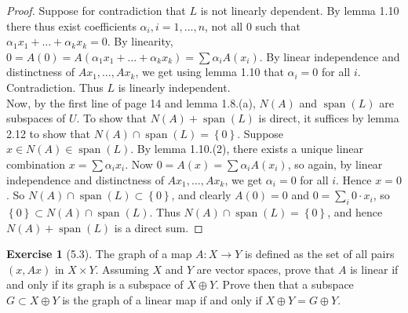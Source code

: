 \documentclass[reqno]{amsart}
\theoremstyle{definition}
\newtheorem{exercise}[theorem]{Exercise}
\theoremstyle{remark}
\DeclareMathOperator{\Span}{span}
\begin{document}
\begin{proof}
    Suppose for contradiction that
    $L$ is not linearly dependent. By lemma 1.10 there
    thus exist coefficients $\alpha_i, i
    =1, \ldots, n$, not all $0$ such that
    $\alpha_1 x_1 +\ldots + \alpha_k x_k = 0$. By linearity,
    $0 = A(0) = 
    A \left( \alpha_1 x_1 +\ldots+ \alpha_k x_k \right) 
    = \sum \alpha_i A(x_i)$. By linear independence and
    distinctness of
    $Ax_1, \ldots, Ax_k$, we get using lemma 1.10 that
    $ \alpha_i = 0$ for all $i$. Contradiction. Thus
    $L$ is linearly independent.\\
    Now, by the first line of page 14 and
    lemma 1.8.(a),
    $N(A)$ and $\Span (L)$ are subspaces of $U$. 
    To show that $N(A) + \Span(L)$ is direct,
    it suffices by lemma 2.12 to show that
    $N(A) \cap \Span (L) = \left\{ 0 \right\} $.
    Suppose $x \in N(A) \in \Span (L)$. By
    lemma 1.10.(2), there exists a unique linear
    combination $x = \sum \alpha_i x_i$. Now
    $0 = A(x) = \sum \alpha_i A(x_i)$, so
    again, by linear independence and distinctness of $A x_1,
    \ldots, A x_k$, we get $\alpha_i = 0$ for all $i$. Hence
     $x = 0$. So  $N(A) \cap \Span (L) \subset \left\{ 0 \right\} $,
     and clearly $A(0) = 0$ and
     $0 = \sum_{i} 0 \cdot x_i$, so
     $\left\{ 0 \right\} \subset N(A)\cap \Span (L)$. Thus
     $N(A) \cap \Span (L) = \left\{ 0 \right\} $, and hence
     $N(A) + \Span (L)$ is a direct sum.
\end{proof}



\begin{exercise}[5.3]
    The graph of a map $A \colon X \to Y$ is defined as the
    set of all pairs $\left( x, Ax \right) $ in
    $X \times Y$. Assuming $X$ and $Y$ are vector spaces,
    prove that $A$ is linear if and only if its graph
    is a subspace of $X \oplus Y$. Prove then that
    a subspace $G \subset X \oplus Y$ is the graph of
    a linear map if and only if $X \oplus Y = G \oplus Y$.
\end{exercise}
\end{document}
